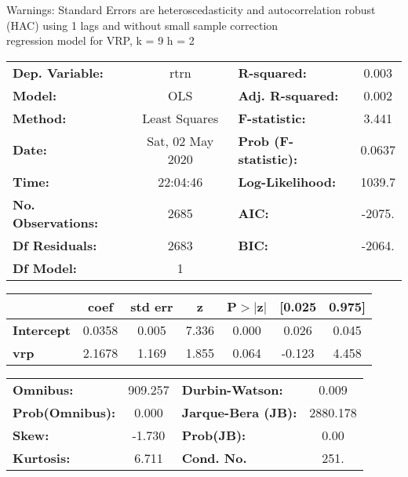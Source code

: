 Warnings: \newline
 [1] Standard Errors are heteroscedasticity and autocorrelation robust (HAC) using 1 lags and without small sample correction\\ 

regression model for VRP, k = 9 h = 2\begin{center}
\begin{tabular}{lclc}
\toprule
\textbf{Dep. Variable:}    &       rtrn       & \textbf{  R-squared:         } &     0.003   \\
\textbf{Model:}            &       OLS        & \textbf{  Adj. R-squared:    } &     0.002   \\
\textbf{Method:}           &  Least Squares   & \textbf{  F-statistic:       } &     3.441   \\
\textbf{Date:}             & Sat, 02 May 2020 & \textbf{  Prob (F-statistic):} &   0.0637    \\
\textbf{Time:}             &     22:04:46     & \textbf{  Log-Likelihood:    } &    1039.7   \\
\textbf{No. Observations:} &        2685      & \textbf{  AIC:               } &    -2075.   \\
\textbf{Df Residuals:}     &        2683      & \textbf{  BIC:               } &    -2064.   \\
\textbf{Df Model:}         &           1      & \textbf{                     } &             \\
\bottomrule
\end{tabular}
\begin{tabular}{lcccccc}
                   & \textbf{coef} & \textbf{std err} & \textbf{z} & \textbf{P$> |$z$|$} & \textbf{[0.025} & \textbf{0.975]}  \\
\midrule
\textbf{Intercept} &       0.0358  &        0.005     &     7.336  &         0.000        &        0.026    &        0.045     \\
\textbf{vrp}       &       2.1678  &        1.169     &     1.855  &         0.064        &       -0.123    &        4.458     \\
\bottomrule
\end{tabular}
\begin{tabular}{lclc}
\textbf{Omnibus:}       & 909.257 & \textbf{  Durbin-Watson:     } &    0.009  \\
\textbf{Prob(Omnibus):} &   0.000 & \textbf{  Jarque-Bera (JB):  } & 2880.178  \\
\textbf{Skew:}          &  -1.730 & \textbf{  Prob(JB):          } &     0.00  \\
\textbf{Kurtosis:}      &   6.711 & \textbf{  Cond. No.          } &     251.  \\
\bottomrule
\end{tabular}
\end{center}

